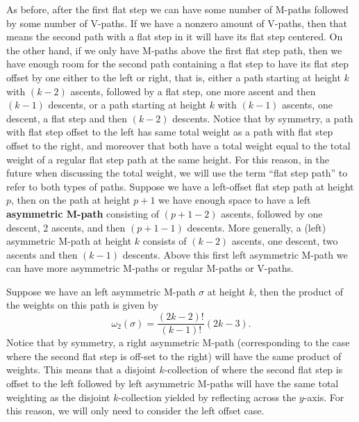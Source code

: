 \documentclass[11pt]{article}
\theoremstyle{mythm}
\begin{document}
As before, after the first flat step we can have some number of M-paths followed by some number of V-paths. If we have a nonzero amount of V-paths, then that means the second path with a flat step in it will have its flat step centered. On the other hand, if we only have M-paths above the first flat step path, then we have enough room for the second path containing a flat step to have its flat step offset by one either to the left or right, that is, either a path starting at height $k$ with $(k-2)$ ascents, followed by a flat step, one more ascent and then $(k-1)$ descents, or a path starting at height $k$ with $(k-1)$ ascents, one descent, a flat step and then $(k-2)$ descents. Notice that by symmetry, a path with flat step offset to the left has same total weight as a path with flat step offset to the right, and moreover that both have a total weight  equal to the total weight of a regular flat step path at the same height. For this reason, in the future when discussing the total weight, we will use the term ``flat step path'' to refer to both types of paths. Suppose we have a left-offset flat step path at height $p$, then on the path at height $p+1$ we have enough space to have a left \textbf{asymmetric M-path} consisting of $(p+1-2)$ ascents, followed by one descent, 2 ascents, and then $(p+1-1)$ descents. More generally, a (left) asymmetric M-path at height $k$ consists of $(k-2)$ ascents, one descent, two ascents and then $(k-1)$ descents. Above this first left asymmetric M-path we can have more asymmetric M-paths or regular M-paths or V-paths.

Suppose we have an left asymmetric M-path $\sigma$ at height $k$, then the product of the weights on this path is given by
\begin{equation*}
\omega_2(\sigma) = \frac{(2k-2)!}{(k-1)!}(2k-3).
\end{equation*}
Notice that by symmetry, a right asymmetric M-path (corresponding to the case where the second flat step is off-set to the right) will have the same product of weights. This means that a disjoint $k$-collection of where the second flat step is offset to the left followed by left asymmetric M-paths will have the same total weighting as the disjoint $k$-collection yielded by reflecting across the $y$-axis. For this reason, we will only need to consider the left offset case.
\end{document}
